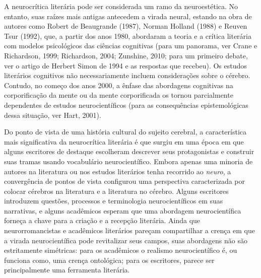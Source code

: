 A neurocrítica literária pode ser considerada um ramo da neuroestética.
No entanto, suas raízes mais antigas antecedem a virada neural, estando
na obra de autores como Robert de Beaugrande (1987), Norman Holland
(1988) e Reuven Tsur (1992), que, a partir dos anos 1980, abordaram a
teoria e a crítica literária com modelos psicológicos das ciências
cognitivas (para um panorama, ver Crane e Richardson, 1999; Richardson,
2004; Zunshine, 2010; para um primeiro debate, ver o artigo de Herbert
Simon de 1994 e as respostas que recebeu). Os estudos literários
cognitivos não necessariamente incluem considerações sobre o cérebro.
Contudo, no começo dos anos 2000, a ênfase das abordagens cognitivas na
corporificação da mente ou da mente corporificada os tornou parcialmente
dependentes de estudos neurocientíficos (para as consequências
epistemológicas dessa situação, ver Hart, 2001).

Do ponto de vista de uma história cultural do sujeito cerebral, a
característica mais significativa da neurocrítica literária é que surgiu
em uma época em que alguns escritores de destaque escolheram descrever
seus protagonistas e construir suas tramas usando vocabulário
neurocientífico. Embora apenas uma minoria de autores na literatura ou
nos estudos literários tenha recorrido ao \emph{neuro}, a convergência
de pontos de vista configurou uma perspectiva caracterizada por colocar
cérebros na literatura e a literatura no cérebro. Alguns escritores
introduzem questões, processos e terminologia neurocientíficos em suas
narrativas, e alguns acadêmicos esperam que uma abordagem
neurocientífica forneça a chave para a criação e a recepção literária.
Ainda que neurorromancistas e acadêmicos literários pareçam compartilhar
a crença em que a virada neurocientífica pode revitalizar seus campos,
suas abordagens não são estritamente simétricas: para os acadêmicos o
realismo neurocientífico é, ou funciona como, uma crença ontológica;
para os escritores, parece ser principalmente uma ferramenta literária.

